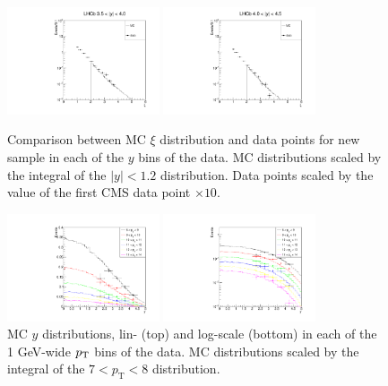 \documentclass{article}
\begin{document}
\begin{figure}[h!]
\includegraphics[width = 0.4\textwidth]{plots/xi_LHCb_y4.pdf}
\includegraphics[width = 0.4\textwidth]{plots/xi_LHCb_y5.pdf}
\caption{Comparison between MC $\xi$ distribution and data points for new sample in each of the $y$ bins of the data. MC distributions scaled by the integral of the $|y|<1.2$ distribution. Data points scaled by the value of the first CMS data point $\times 10$.}\label{f:xi_comp_new}
\end{figure}

\clearpage

\begin{figure}[h!]
\centering
\includegraphics[width = 0.4\textwidth]{plots/y_dist.pdf}

\includegraphics[width = 0.4\textwidth]{plots/y_dist_log.pdf}
\caption{MC $y$ distributions, lin- (top) and log-scale (bottom) in each of the 1 GeV-wide $p_\text T$ bins of the data. MC distributions scaled by the integral of the $7<p_\text{T}<8$ distribution.}\label{f:y_comp_rho_log}
\end{figure}
\end{document}
